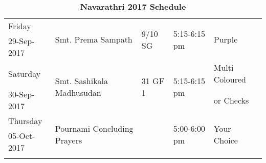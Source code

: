 \documentclass[12pt]{article}
\begin{document}
\begin{longtable}{|p{}|p{}|p{}|p{}|p{}|}
Friday&\multirow{2}{*}{Smt. Prema Sampath}&\multirow{2}{*}{9/10 SG}&\multirow{2}{*}{5:15-6:15 pm}&\multirow{2}{*}{Purple}\\
29-Sep-2017&&&&\\\hline

Saturday&\multirow{2}{*}{Smt. Sashikala Madhusudan}&\multirow{2}{*}{31 GF 1}&\multirow{2}{*}{5:15-6:15 pm}&Multi Coloured\\
30-Sep-2017&&&&or Checks\\\hline

Thursday&\multirow{2}{*}{Pournami Concluding Prayers}&\multirow{2}{*}{}&\multirow{2}{*}{5:00-6:00 pm}&\multirow{2}{*}{Your Choice}\\
05-Oct-2017&&&&\\\hline
\caption*{\textbf{Navarathri 2017 Schedule}}
\label{table:programme2017}
\end{longtable}

\newpage
\singlespacing
\setlength\extrarowheight{0pt}
\normalsize
\end{document}
